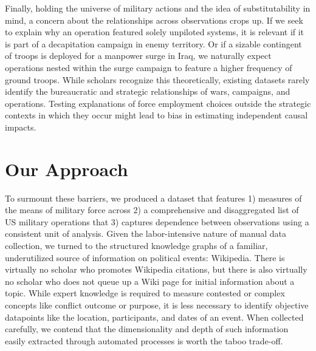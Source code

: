 \documentclass[fleqn,12pt]{article}
\begin{document}
Finally, holding the universe of military actions and the idea of substitutability in mind, a concern about the relationships across observations crops up. If we seek to explain why an operation featured solely unpiloted systems, it is relevant if it is part of a decapitation campaign in enemy territory. Or if a sizable contingent of troops is deployed for a manpower surge in Iraq, we naturally expect operations nested within the surge campaign to feature a higher frequency of ground troops. While scholars recognize this theoretically, existing datasets rarely identify the bureaucratic and strategic relationships of wars, campaigns, and operations. Testing explanations of force employment choices outside the strategic contexts in which they occur might lead to bias in estimating independent causal impacts.

\section*{Our Approach}
To surmount these barriers, we produced a dataset that features 1) measures of the means of military force across 2) a comprehensive and disaggregated list of US military operations that 3) captures dependence between observations using a consistent unit of analysis. Given the labor-intensive nature of manual data collection, we turned to the structured knowledge graphs of a familiar, underutilized source of information on political events: Wikipedia. There is virtually no scholar who promotes Wikipedia citations, but there is also virtually no scholar who does not queue up a Wiki page for initial information about a topic. While expert knowledge is required to measure contested or complex concepts like conflict outcome or purpose, it is less necessary to identify objective datapoints like the location, participants, and dates of an event. When collected carefully, we contend that the dimensionality and depth of such information easily extracted through automated processes is worth the taboo trade-off.
\end{document}

